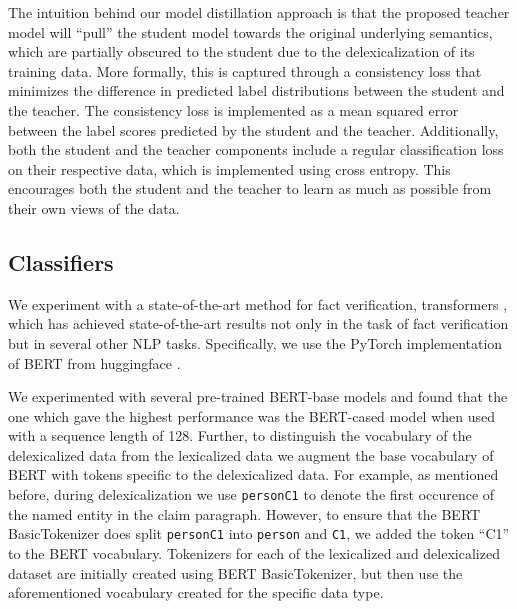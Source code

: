 The intuition behind our model distillation approach is that the proposed teacher model will ``pull'' the student model towards the original underlying semantics, which are partially obscured to the student due to the delexicalization of its training data. More formally, this is captured through a consistency loss that minimizes the difference in predicted label distributions between the student and the teacher. The consistency loss is implemented as a mean squared error between the label scores predicted by the student and the teacher. Additionally, both the student and the teacher components include a regular classification loss on their respective data, which is implemented using cross entropy. This encourages both the student and the teacher to learn as much as possible from their own views of the data.



\subsection{Classifiers}

We experiment with a state-of-the-art method for fact verification, transformers \citep{vaswani2017attention}, which has achieved state-of-the-art results not only in the task of fact verification but in several other NLP tasks. Specifically, we use the PyTorch implementation of BERT \cite{devlin-etal-2019-bert} from huggingface \citep{wolf2019huggingface}.

We experimented with several pre-trained BERT-base models and found that the one which gave the highest performance was the BERT-cased model when used with a sequence length of 128. Further, to distinguish the vocabulary of the delexicalized data from the lexicalized data we augment the base vocabulary of BERT with tokens specific to the delexicalized data. For example, as mentioned before, during delexicalization we use \texttt{personC1} to denote the first occurence of the named entity in the claim paragraph. However, to ensure that the BERT BasicTokenizer does split \texttt{personC1} into \texttt{person}  and \texttt{C1}, we added the token ``C1'' to the BERT vocabulary. Tokenizers for each of the lexicalized and delexicalized dataset are initially created using BERT BasicTokenizer, but then use the aforementioned vocabulary created for the specific data type.





